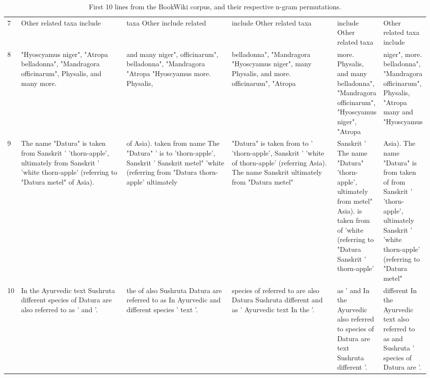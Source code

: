 \begin{table*}[]
{\begin{tabular}{|l|p{0.3\linewidth}|p{0.3\linewidth}|p{0.3\linewidth}|p{0.3\linewidth}|p{0.3\linewidth}|}
7 & Other related taxa include & taxa Other include related & include Other related taxa & include Other related taxa & Other related taxa include \\
8 & "Hyoscyamus niger", "Atropa belladonna", "Mandragora officinarum", Physalis, and many more. & and many niger", officinarum", belladonna", "Mandragora "Atropa "Hyoscyamus more. Physalis, & belladonna", "Mandragora "Hyoscyamus niger", many Physalis, and more. officinarum", "Atropa & more. Physalis, and many belladonna", "Mandragora officinarum", "Hyoscyamus niger", "Atropa & niger", more. belladonna", "Mandragora officinarum", Physalis, "Atropa many and "Hyoscyamus \\
9 & The name "Datura" is taken from Sanskrit ' 'thorn-apple', ultimately from Sanskrit ' 'white thorn-apple' (referring to "Datura metel" of Asia). & of Asia). taken from name The "Datura" ' is to 'thorn-apple', Sanskrit ' Sanskrit metel" 'white (referring from "Datura thorn-apple' ultimately & "Datura" is taken from to ' 'thorn-apple', Sanskrit ' 'white of thorn-apple' (referring Asia). The name Sanskrit ultimately from "Datura metel" & Sanskrit ' The name "Datura" 'thorn-apple', ultimately from metel" Asia). is taken from of 'white (referring to "Datura Sanskrit ' thorn-apple' & Asia). The name "Datura" is from taken of from Sanskrit ' 'thorn-apple', ultimately Sanskrit ' 'white thorn-apple' (referring to "Datura metel" \\
10 & In the Ayurvedic text Sushruta different species of Datura are also referred to as ' and '. & the of also Sushruta Datura are referred to as In Ayurvedic and different species ' text '. & species of referred to are also Datura Sushruta different and as ' Ayurvedic text In the '. & as ' and In the Ayurvedic also referred to species of Datura are text Sushruta different '. & different In the Ayurvedic text also referred to as and Sushruta ' species of Datura are '. \\ \bottomrule
\end{tabular}%
}
\caption{First 10 lines from the BookWiki corpus, and their respective n-gram permutations.}
\label{tab:sample_permutations}
\end{table*}